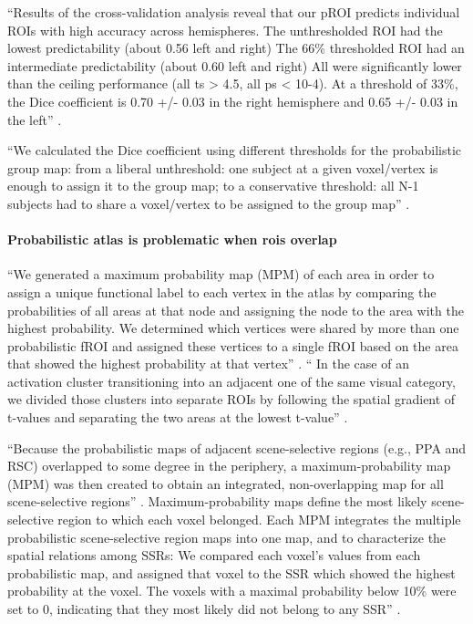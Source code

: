 ``Results of the cross-validation analysis reveal that our pROI predicts
individual ROIs with high accuracy across hemispheres.
%
The unthresholded ROI had the lowest predictability (about 0.56 left and right)
%
The 66\% thresholded ROI had an intermediate predictability (about 0.60 left and
right)
%
All were significantly lower than the ceiling performance (all ts > 4.5, all ps
< 10-4).
%
At a threshold of 33\%, the Dice coefficient is 0.70 +/- 0.03 in the right
hemisphere and 0.65 +/- 0.03 in the left'' \citep{weiner2018defining}.

%
``We calculated the Dice coefficient using different thresholds for the
probabilistic group map:
%
from a liberal unthreshold: one subject at a given voxel/vertex is enough to
assign it to the group map;
%
to a conservative threshold: all N-1 subjects had to share a voxel/vertex to be
assigned to the group map'' \citet{rosenke2021probabilistic}.


\paragraph{Probabilistic atlas is problematic when \acp{roi} overlap}
%
``We generated a maximum probability map (MPM) of each area in order to assign a
unique functional label to each vertex in the atlas by comparing the
probabilities of all areas at that node and assigning the node to the area with
the highest probability.
%
We determined which vertices were shared by more than one probabilistic fROI and
assigned these vertices to a single fROI based on the area that showed the
highest probability at that vertex'' \citep{rosenke2021probabilistic}.
%
``
In the case of an activation cluster transitioning into an adjacent one of the
same visual category, we divided those clusters into separate ROIs by following
the spatial gradient of t-values and separating the two areas at the lowest
t-value'' \citep{rosenke2021probabilistic}.


%
``Because the probabilistic maps of adjacent scene-selective regions (e.g., PPA
and RSC) overlapped to some degree in the periphery, a maximum-probability map
(MPM) was then created to obtain an integrated, non-overlapping map for all
scene-selective regions'' \citep{zhen2017quantifying}.
%
Maximum-probability maps define the most likely scene-selective region to
which each voxel belonged.
%
Each MPM integrates the multiple probabilistic scene-selective region maps into
one map, and to characterize the spatial relations among SSRs:
%
We compared each voxel's values from each probabilistic map, and assigned that
voxel to the SSR which showed the highest probability at the voxel.
%
The voxels with a maximal probability below 10\% were set to 0, indicating that
they most likely did not belong to any SSR'' \citep{zhen2017quantifying}.


